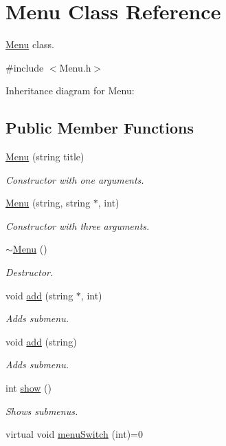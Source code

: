 \hypertarget{classMenu}{}\section{Menu Class Reference}
\label{classMenu}


\hyperlink{classMenu}{Menu} class.  




{\ttfamily \#include $<$Menu.\+h$>$}



Inheritance diagram for Menu\+:
\subsection*{Public Member Functions}
\begin{DoxyCompactItemize}
\item 
\hyperlink{classMenu_a3377fd5036a2f8f93eee473afd570185}{Menu} (string title)\hypertarget{classMenu_a3377fd5036a2f8f93eee473afd570185}{}\label{classMenu_a3377fd5036a2f8f93eee473afd570185}

\begin{DoxyCompactList}\small\item\em Constructor with one arguments. \end{DoxyCompactList}\item 
\hyperlink{classMenu_a28dcf937389ad94a178caef7b28a11a8}{Menu} (string, string $\ast$, int)
\begin{DoxyCompactList}\small\item\em Constructor with three arguments. \end{DoxyCompactList}\item 
\hyperlink{classMenu_a831387f51358cfb88cd018e1777bc980}{$\sim$\+Menu} ()
\begin{DoxyCompactList}\small\item\em Destructor. \end{DoxyCompactList}\item 
void \hyperlink{classMenu_a2be45a29dd0fa643d5fc118350bce944}{add} (string $\ast$, int)
\begin{DoxyCompactList}\small\item\em Adds submenu. \end{DoxyCompactList}\item 
void \hyperlink{classMenu_a5423c0d700c20bf8bdd0fb1dbf0c0f6f}{add} (string)
\begin{DoxyCompactList}\small\item\em Adds submenu. \end{DoxyCompactList}\item 
int \hyperlink{classMenu_a346009151f57e18ffe0fa5a9dd89b1d6}{show} ()
\begin{DoxyCompactList}\small\item\em Shows submenus. \end{DoxyCompactList}\item 
virtual void \hyperlink{classMenu_ae9d7af36b1a380e5e4b03ddbef9ceeca}{menu\+Switch} (int)=0\hypertarget{classMenu_ae9d7af36b1a380e5e4b03ddbef9ceeca}{}\label{classMenu_ae9d7af36b1a380e5e4b03ddbef9ceeca}


\end{DoxyCompactItemize}
